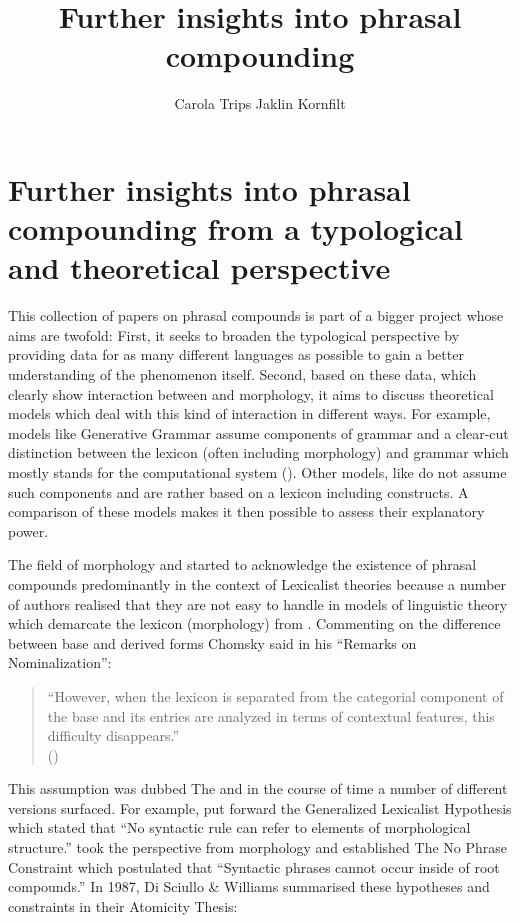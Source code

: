 \documentclass[output=paper]{LSP/langsci}
\author{Carola Trips\affiliation{Universität Mannheim} 
 \lastand Jaklin Kornfilt\affiliation{Syracuse University}
}
\title{Further insights into phrasal compounding}
\begin{document}
\section{Further insights into phrasal compounding from a typological
  and theoretical perspective} 


This collection of papers on phrasal compounds is part of a bigger project
whose aims are twofold: First, it seeks to broaden the typological
perspective by providing data for as many different languages as
possible to gain a better understanding of the phenomenon
itself. Second, based on these data, which clearly show interaction
between  and morphology, it aims to discuss theoretical models
which deal with this kind of interaction in different ways. For
example, models like Generative Grammar assume components of grammar and a
clear-cut distinction between the lexicon (often including
morphology) and grammar which mostly stands for the
computational system (). Other models, like  do not assume
such components and are rather based on a lexicon including constructs. A comparison of
these models makes it then possible to assess their explanatory power.  

The field of morphology and  started to acknowledge the existence of
phrasal compounds predominantly in the context of Lexicalist theories because a
number of authors realised that they are not easy to
handle in models of linguistic theory which demarcate the lexicon
(morphology) from . Commenting on the difference
between base and derived forms Chomsky said in his ``Remarks on
Nominalization'':
  
\begin{quote}
``However, when the lexicon
is separated from the categorial component of the base and its entries are
analyzed in terms of contextual features, this difficulty disappears.''\\
{\small (\citealp[190]{Chomsky1970})}
\end{quote}

This assumption was dubbed The  and in the course
of time a number of different versions surfaced. For example,
\citet[8]{Lapointe1980} put forward the Generalized Lexicalist
Hypothesis which stated that ``No syntactic rule can refer to elements of morphological structure.''
\citet[18]{Botha1981} took the perspective from morphology and established The No Phrase
Constraint which postulated that ``Syntactic phrases cannot occur inside of root compounds.''
In 1987, Di Sciullo \& Williams summarised these hypotheses and
constraints in their Atomicity Thesis:
\end{document}
